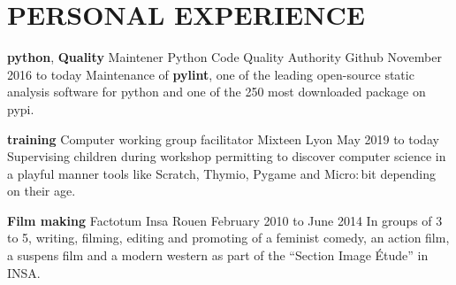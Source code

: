 \documentclass[11pt,a4paper]{moderncv}
\begin{document}


  \section{PERSONAL EXPERIENCE}\label{sec:personal-experience}

  \cventry
    {\textbf{python}, \textbf{Quality}}
    {Maintener}
    {Python Code Quality Authority}
    {Github}
    {November 2016  to today}{
      Maintenance of \textbf{pylint}, one of the leading open-source static analysis software for python
      and one of the 250 most downloaded package on pypi.
    }

    \cventry
    {\textbf{training}}
    {Computer working group facilitator}
    {Mixteen}
    {Lyon}
    {May 2019 to today}{
	  Supervising children during workshop permitting to discover computer science in a
	  playful manner tools like Scratch, Thymio, Pygame and Micro$:$bit depending on their age.
    }




    \cventry
    {\textbf{Film making}}
    {Factotum}
    {Insa}
    {Rouen}
    {February 2010 to June 2014}{
      In groups of 3 to 5, writing, filming, editing and promoting of a
      feminist comedy, an action film, a suspens film and a modern western as
      part of the ``Section Image Étude'' in INSA.
    }

\end{document}
